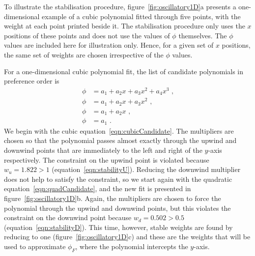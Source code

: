 To illustrate the stabilisation procedure, figure~\ref{fig:oscillatory1D}a presents a one-dimensional example of a cubic polynomial fitted through five points, with the weight at each point printed beside it.
The stabilisation procedure only uses the $x$ positions of these points and does not use the values of $\phi$ themselves.  The $\phi$ values are included here for illustration only.
Hence, for a given set of $x$ positions, the same set of weights are chosen irrespective of the $\phi$ values.

For a one-dimensional cubic polynomial fit, the list of candidate polynomials in preference order is
\begin{align}
	\phi &= a_1 + a_2 x + a_3 x^2 + a_4 x^3 \label{eqn:cubicCandidate} \text{ ,} \\
	\phi &= a_1 + a_2 x + a_3 x^2 \label{eqn:quadCandidate} \text{ ,} \\
	\phi &= a_1 + a_2 x \text{ ,} \\
	\phi &= a_1 \text{ .}
\end{align}
We begin with the cubic equation~\eqref{eqn:cubicCandidate}.  The multipliers are chosen so that the polynomial passes almost exactly through the upwind and downwind points that are immediately to the left and right of the $y$-axis respectively.
The constraint on the upwind point is violated because $w_u = 1.822 > 1$ (equation~\ref{eqn:stabilityU}).  Reducing the downwind multiplier does not help to satisfy the constraint, so we start again with the quadratic equation~\eqref{eqn:quadCandidate}, and the new fit is presented in figure~\ref{fig:oscillatory1D}b.
Again, the multipliers are chosen to force the polynomial through the upwind and downwind points, but this violates the constraint on the downwind point because $w_d = 0.502 > 0.5$ (equation~\ref{eqn:stabilityD}).  This time, however, stable weights are found by reducing  to one (figure~\ref{fig:oscillatory1D}c) and these are the weights that will be used to approximate $\phi_F$, where the polynomial intercepts the $y$-axis.
